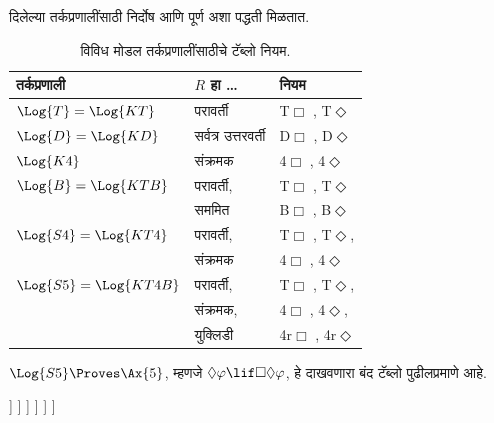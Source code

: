 दिलेल्या तर्कप्रणालींसाठी निर्दोष आणि पूर्ण
अशा पद्धती मिळतात.
\begin{table}
  \begin{center}
    \begin{tabular}{lll}
      \hline
      तर्कप्रणाली & $R$ हा \dots & नियम\\
      \hline
      $\Log{T} = \Log{KT}$ & परावर्ती &
      T$\Box$
      ,
      T$\Diamond$
      \\ \hline
      $\Log{D} = \Log{KD}$ & सर्वत्र उत्तरवर्ती &
      D$\Box$
      ,
      D$\Diamond$
      \\ \hline
      $\Log{K4}$ & संक्रमक &
      4$\Box$
      ,
      4$\Diamond$
      \\ \hline
      $\Log{B} = \Log{KTB}$ & परावर्ती, &
      T$\Box$
      ,
      T$\Diamond$\\
      & सममित &
      B$\Box$
      ,
      B$\Diamond$
      \\ \hline
      $\Log{S4} = \Log{KT4}$ & परावर्ती, &
      T$\Box$
      ,
      T$\Diamond$,\\
      & संक्रमक &
      4$\Box$
      ,
      4$\Diamond$
      \\ \hline
      $\Log{S5} = \Log{KT4B}$ & परावर्ती, &
      T$\Box$
      ,
      T$\Diamond$,\\
      & संक्रमक, &
      4$\Box$
      ,
      4$\Diamond$,\\
      &  युक्लिडी &
      4r$\Box$
      ,
      4r$\Diamond$
      \\ \hline
    \end{tabular}
  \end{center}
  \caption{विविध मोडल तर्कप्रणालींसाठीचे टॅब्लो नियम.}
  \label{nml:tab:mru:tab:logics-rules}
\end{table}
\begin{ex}
  $\Log{S5} \Proves \Ax{5}$, म्हणजे
  $\Diamond\varphi \lif \Box\Diamond\varphi$, हे दाखवणारा
  बंद टॅब्लो पुढीलप्रमाणे आहे.
  \begin{oltableau}
    [\pFmla{\False}{\Diamond\formula{A} \lif \Box\Diamond \formula{A}}{1},
      just = \TAss
      [\pFmla{\True}{\Diamond \formula{A}}{1}, just = {\TRule{\False}{\lif}[1]}
        [\pFmla{\False}{\Box\Diamond \formula{A}}{1},
          just = {\TRule{\False}{\lif}[1]}
          [\pFmla{\False}{\Diamond \formula{A}}{1.1},
            just = {\TRule{\False}{\Box}[3]}
            [\pFmla{\False}{\Diamond \formula{A}}{1},
              just = {4r$\Diamond$ 4}
              [\pFmla{\True}{\formula{A}}{1.2},
                just = {\TRule{\True}{\Diamond}[2]}
                [\pFmla{\False}{\formula{A}}{1.2},
                  just = {\TRule{\False}{\Diamond}[5]}, close]
              ]
            ]
          ]
        ]
      ]
    ]
  \end{oltableau}
\end{ex}
